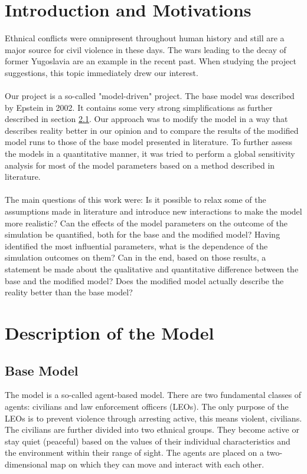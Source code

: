 \documentclass[11pt]{article}
\begin{document}
\section{Introduction and Motivations}
Ethnical conflicts were omnipresent throughout human history and still are a major source for civil violence in these days. The wars leading to the decay of former Yugoslavia are an example in the recent past. When studying the project suggestions, this topic immediately drew our interest.\\
\\
Our project is a so-called "model-driven" project. The base model was described by Epstein in 2002. It contains some very strong simplifications as further described in section \ref{subsec:base_model}. Our approach was to modify the model in a way that describes reality better in our opinion and to compare the results of the modified model runs to those of the base model presented in literature. To further assess the models in a quantitative manner, it was tried to perform a global sensitivity analysis for most of the model parameters based on a method described in literature.\\
\\
The main questions of this work were: Is it possible to relax some of the assumptions made in literature and introduce new interactions to make the model more realistic? Can the effects of the model parameters on the outcome of the simulation be quantified, both for the base and the modified model? Having identified the most influential parameters, what is the dependence of the simulation outcomes on them? Can in the end, based on those results, a statement be made about the qualitative and quantitative difference between the base and the modified model? Does the modified model actually describe the reality better than the base model?

\section{Description of the Model}
\label{sec:description_model}

\subsection{Base Model}
\label{subsec:base_model}
The model is a so-called agent-based model. There are two fundamental classes of agents: civilians and law enforcement officers (LEOs). The only purpose of the LEOs is to prevent violence through arresting active, this means violent, civilians. The civilians are further divided into two ethnical groups. They become active or stay quiet (peaceful) based on the values of their individual characteristics and the environment within their range of sight. The agents are placed on a two-dimensional map on which they can move and interact with each other.
\end{document}
